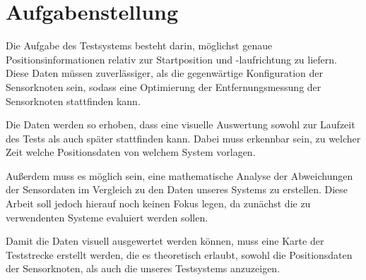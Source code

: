 \section{Aufgabenstellung}
\label{sec:aufgabenstellung}

Die Aufgabe des Testsystems besteht darin, möglichst genaue Positionsinformationen relativ zur Startposition und -laufrichtung zu liefern. Diese Daten müssen zuverlässiger, als die gegenwärtige Konfiguration der Sensorknoten sein, sodass eine Optimierung der Entfernungsmessung der Sensorknoten stattfinden kann.

Die Daten werden so erhoben, dass eine visuelle Auswertung sowohl zur Laufzeit des Tests als auch später stattfinden kann. Dabei muss erkennbar sein, zu welcher Zeit welche Positionsdaten von welchem System vorlagen.

Außerdem muss es möglich sein, eine mathematische Analyse der Abweichungen der Sensordaten im Vergleich zu den Daten unseres Systems zu erstellen. Diese Arbeit soll jedoch hierauf noch keinen Fokus legen, da zunächst die zu verwendenten Systeme evaluiert werden sollen.

Damit die Daten visuell ausgewertet werden können, muss eine Karte der Teststrecke erstellt werden, die es theoretisch erlaubt, sowohl die Positionsdaten der Sensorknoten, als auch die unseres Testsystems anzuzeigen.